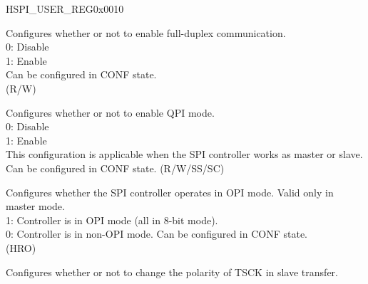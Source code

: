 \begin{register}{H}{SPI\_USER\_REG}{0x0010}\label{regdesc:SPIUSERREG}
%
%
%
%
%
%
%
%
%
%
%
%
%
%
%
%
%
%
%
%
%
%
%
%
%
\regnewline%
\begin{regdesc}\begin{reglist}
\label{fielddesc:SPIDOUTDIN}\item [SPI\_DOUTDIN] Configures whether or not to enable full-duplex communication. \\
0: Disable \\
1: Enable \\
Can be configured in CONF state. \\ (R/W)
\label{fielddesc:SPIQPIMODE}\item [SPI\_QPI\_MODE] Configures whether or not to enable QPI mode. \\
0: Disable \\
1: Enable \\
This configuration is applicable when the SPI controller works as master or slave. Can be configured in CONF state. (R/W/SS/SC)
\label{fielddesc:SPIOPIMODE}\item [SPI\_OPI\_MODE] Configures whether the SPI controller operates in OPI mode. Valid only in master mode. \\1: Controller is in OPI mode (all in 8-bit mode). \\0: Controller is in non-OPI mode.
Can be configured in CONF state. \\(HRO)
\label{fielddesc:SPITSCKIEDGE}\item [SPI\_TSCK\_I\_EDGE] Configures whether or not to change the polarity of TSCK in slave transfer. \\

\end{reglist}
\end{regdesc}
\end{register}
